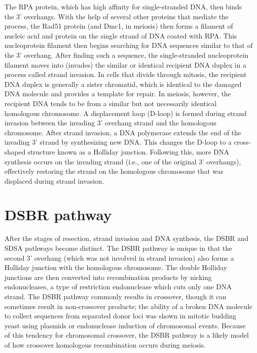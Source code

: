 The RPA protein, which has high affinity for single-stranded DNA, then binds the 3' overhangs. With the help of several other proteins that mediate the process, the Rad51 protein (and Dmc1, in meiosis) then forms a filament of nucleic acid and protein on the single strand of DNA coated with RPA. This nucleoprotein filament then begins searching for DNA sequences similar to that of the 3' overhang. After finding such a sequence, the single-stranded nucleoprotein filament moves into (invades) the similar or identical recipient DNA duplex in a process called strand invasion. In cells that divide through mitosis, the recipient DNA duplex is generally a sister chromatid, which is identical to the damaged DNA molecule and provides a template for repair. In meiosis, however, the recipient DNA tends to be from a similar but not necessarily identical homologous chromosome. A displacement loop (D-loop) is formed during strand invasion between the invading 3' overhang strand and the homologous chromosome. After strand invasion, a DNA polymerase extends the end of the invading 3' strand by synthesizing new DNA. This changes the D-loop to a cross-shaped structure known as a Holliday junction. Following this, more DNA synthesis occurs on the invading strand (i.e., one of the original 3' overhangs), effectively restoring the strand on the homologous chromosome that was displaced during strand invasion.

\hypertarget{dsbr-pathway}{%
\section{DSBR pathway}\label{dsbr-pathway}}

After the stages of resection, strand invasion and DNA synthesis, the DSBR and SDSA pathways become distinct. The DSBR pathway is unique in that the second 3' overhang (which was not involved in strand invasion) also forms a Holliday junction with the homologous chromosome. The double Holliday junctions are then converted into recombination products by nicking endonucleases, a type of restriction endonuclease which cuts only one DNA strand. The DSBR pathway commonly results in crossover, though it can sometimes result in non-crossover products; the ability of a broken DNA molecule to collect sequences from separated donor loci was shown in mitotic budding yeast using plasmids or endonuclease induction of chromosomal events. Because of this tendency for chromosomal crossover, the DSBR pathway is a likely model of how crossover homologous recombination occurs during meiosis.

